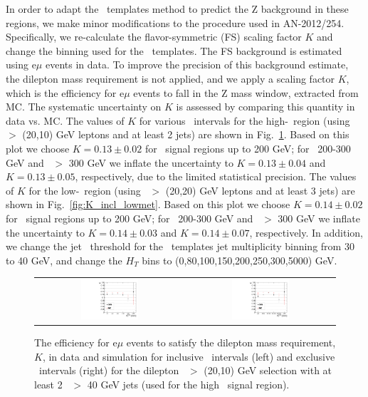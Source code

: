 In order to adapt the \MET\ templates method to predict the Z background in these regions, we make minor modifications
to the procedure used in AN-2012/254. Specifically, we re-calculate
the flavor-symmetric (FS) scaling factor $K$ and change the binning used for the \MET\ templates.
The FS background is estimated using e$\mu$ events in data.
To improve the precision of this background estimate, the dilepton mass requirement is not applied, and we apply a scaling
factor $K$, which is the efficiency for e$\mu$ events to fall in the Z mass window,  extracted from MC.
The systematic uncertainty on $K$ is assessed by comparing this quantity in data vs. MC.
The values of $K$ for various \MET\ intervals for the high-\MET\ region (using \pt\ $>$ (20,10) GeV leptons and at least 2 jets) 
are shown in Fig.~\ref{fig:K_incl_highmet}. 
Based on this plot we choose $K=0.13\pm0.02$ for \MET\ signal regions up to 200 GeV; for \MET\ 200-300 GeV and \MET\ $>$ 300 GeV
we inflate the uncertainty to $K=0.13\pm0.04$ and $K=0.13\pm0.05$, respectively, due to the limited statistical precision.
The values of $K$ for the low-\MET\ region (using \pt\ $>$ (20,20) GeV leptons and at least 3 jets) are shown in 
Fig.~\ref{fig:K_incl_lowmet}. 
Based on this plot we choose $K=0.14\pm0.02$ for \MET\ signal regions up to 200 GeV; for \MET\ 200-300 GeV and \MET\ $>$ 300 GeV
we inflate the uncertainty to $K=0.14\pm0.03$ and $K=0.14\pm0.07$, respectively. In addition, we change the 
jet \pt\ threshold for the \MET\ templates jet multiplicity binning from 30 to 40 GeV, and change the $H_T$ bins to
(0,80,100,150,200,250,300,5000) GeV.

\begin{figure}[!ht]
\begin{center}
\begin{tabular}{cc}
\includegraphics[width=0.4\textwidth]{plots/extractK_inclusive_pt2010_92fb.pdf} &
\includegraphics[width=0.4\textwidth]{plots/extractK_exclusive_pt2010_92fb.pdf} \\
\end{tabular}
\caption{\label{fig:K_incl_highmet}
The efficiency for e$\mu$ events to satisfy the dilepton mass requirement, $K$, in data and simulation for inclusive \MET\ intervals 
(left) and exclusive \MET\ intervals (right) for the dilepton \pt\ $>$ (20,10) GeV selection with at least 2 \pt\ $>$ 40 GeV jets
(used for the high \MET\ signal region). 
}
\end{center}
\end{figure}

